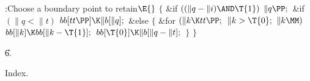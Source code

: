 \B{}:Choose a boundary point to retain\X${}\E{}$\6
${}\{{}$\1\6
\&{if} ${}((\|q-\|i)\AND\T{1}){}$\1\5
${}\|q\PP;{}$\2\6
\&{if} ${}(\|q<\|t){}$\1\5
${}\\{bb}[\\{tt}\PP]\K\|b[\|q];{}$\2\6
\&{else}\5
${}\{{}$\1\6
\&{for} ${}(\|k\K\\{tt}\PP;{}$ ${}\|k>\T{0};{}$ ${}\|k\MM){}$\1\5
${}\\{bb}[\|k]\K\\{bb}[\|k-\T{1}];{}$\2\6
${}\\{bb}[\T{0}]\K\|b[\|q-\|t];{}$\6
\4${}\}{}$\2\6
\4${}\}{}$\2\par
\U6.\fi

Index.
\fi

\inx
\fin
\con

